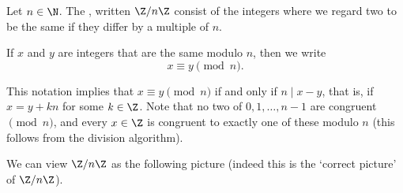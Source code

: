 \documentclass[a4paper]{scrreprt}
\begin{document}
\begin{definition}
	Let $n \in \N$. The , written $\Z/n\Z$ consist of the integers where we regard two to be the same if they differ by a multiple of $n$.
\end{definition}

\begin{definition}
	If $x$ and $y$ are integers that are the same modulo $n$, then we write
	$$
	x \equiv y \pmod{n}.
	$$
\end{definition}

This notation implies that $x \equiv y \pmod{n}$ if and only if $n \mid x - y$, that is, if $x = y + kn$ for some $k \in \Z$.
Note that no two of $0, 1, \dots, n - 1$ are congruent $\pmod{n}$, and every $x \in \Z$ is congruent to exactly one of these modulo $n$ (this follows from the division algorithm).

We can view $\Z/n\Z$ as the following picture (indeed this is the `correct picture' of $\Z/n\Z$).
\end{document}
